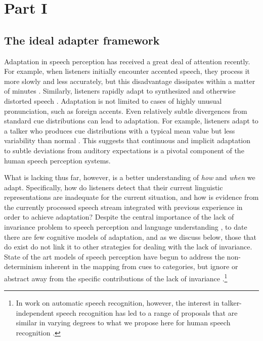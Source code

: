 \section{Part I}
\label{sec:part-i}

\subsection{The ideal adapter framework}
\label{sec:framework}

Adaptation in speech perception has received a great deal of attention recently. For example, when listeners initially encounter accented speech, they process it more slowly and less accurately, but this disadvantage dissipates within a matter of minutes \autocite[][and references therein]{Bradlow2008,Clarke2004}. Similarly, listeners rapidly adapt to synthesized and otherwise distorted speech \autocite[e.g.,][]{Davis2005}. Adaptation is not limited to cases of highly unusual pronunciation, such as foreign accents. Even relatively subtle divergences from standard cue distributions can lead to adaptation.  For example, listeners adapt to a talker who produces cue distributions with a typical mean value but less variability than normal \autocite{Clayards2008}.  This suggests that continuous and implicit adaptation to subtle deviations from auditory expectations is a pivotal component of the human speech perception systems.

What is lacking thus far, however, is a better understanding of \emph{how} and \emph{when} we adapt.  Specifically, how do listeners detect that their current linguistic representations are inadequate for the current situation, and how is evidence from the currently processed speech stream integrated with previous experience in order to achieve adaptation?   Despite the central importance of the lack of invariance problem to speech perception and language understanding \autocite{Liberman1967,Pardo2006}, to date there are few cognitive models of adaptation, and as we discuss below, those that do exist do not link it to other strategies for dealing with the lack of invariance.  State of the art models of speech perception have begun to address the non-determinism inherent in the mapping from cues to categories, but ignore or abstract away from the specific contributions of the lack of invariance \autocite{Feldman2009a,Feldman2013a,Norris2008}.\footnote{In work on automatic speech recognition, however, the interest in talker-independent speech recognition has led to a range of proposals that are similar in varying degrees to what we propose here for human speech recognition \autocite[e.g.,][]{Gauvain1994,Leggetter1995,Shinoda2001}.}

